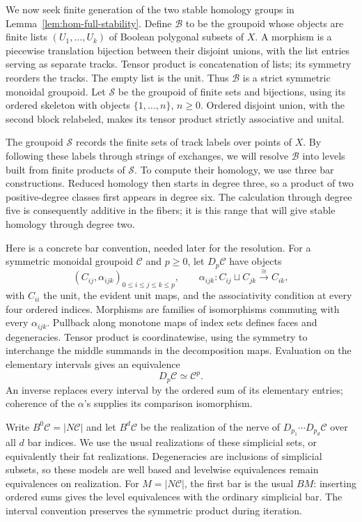 We now seek finite generation of the two stable homology groups in
Lemma~\ref{lem:hom-full-stability}.  Define $\mathcal B$ to be the
groupoid whose objects are finite lists $(U_1,\ldots,U_k)$ of Boolean
polygonal subsets of $X$.  A morphism is a piecewise translation bijection
between their disjoint unions, with the list entries serving as separate
tracks.  Tensor product is concatenation of lists; its symmetry reorders
the tracks.  The empty list is the unit.  Thus $\mathcal B$ is a strict
symmetric monoidal groupoid.  Let $\mathcal S$ be the groupoid of finite
sets and bijections, using its ordered skeleton with objects
$\{1,\ldots,n\}$, $n\geq0$.  Ordered disjoint union, with the second
block relabeled, makes its tensor product strictly associative and unital.

The groupoid $\mathcal S$ records the finite sets of track labels
over points of $X$.  By following these labels through strings of
exchanges, we will resolve $\mathcal B$ into levels built from finite
products of $\mathcal S$.  To compute their homology, we use three
bar constructions.  Reduced homology then starts in degree three,
so a product of two positive-degree classes first appears in degree
six.  The calculation through degree five is consequently additive
in the fibers; it is this range that will give stable homology
through degree two.

Here is a concrete bar convention, needed later for the resolution.
For a symmetric monoidal groupoid $\mathcal C$ and $p\geq0$, let
$D_p\mathcal C$ have objects
\[
 (C_{ij},\alpha_{ijk})_{0\leq i\leq j\leq k\leq p},\qquad
 \alpha_{ijk}:C_{ij}\sqcup C_{jk}\xrightarrow{\ \cong\ } C_{ik},
\]
with $C_{ii}$ the unit, the evident unit maps, and the associativity
condition at every four ordered indices.  Morphisms are families of
isomorphisms commuting with every $\alpha_{ijk}$.  Pullback along monotone
maps of index sets defines faces and degeneracies.  Tensor product is
coordinatewise, using the symmetry to interchange the middle summands in
the decomposition maps.  Evaluation on the elementary intervals gives an
equivalence
\begin{equation}\label{eq:hom-bar-product}
 D_p\mathcal C\simeq\mathcal C^p.
\end{equation}
An inverse replaces every interval by the ordered sum of its elementary
entries; coherence of the $\alpha$'s supplies its comparison isomorphism.

Write $B^0\mathcal C=|N\mathcal C|$ and let $B^d\mathcal C$ be the
realization of the nerve of
$D_{p_1}\cdots D_{p_d}\mathcal C$ over all $d$ bar indices.  We use
the usual realizations of these simplicial sets, or equivalently their
fat realizations.  Degeneracies are inclusions of simplicial subsets, so
these models are well based and levelwise equivalences remain
equivalences on realization.  For $M=|N\mathcal C|$, the first bar is
the usual $BM$: inserting ordered sums gives the level equivalences
with the ordinary simplicial bar.  The interval convention preserves
the symmetric product during iteration.


